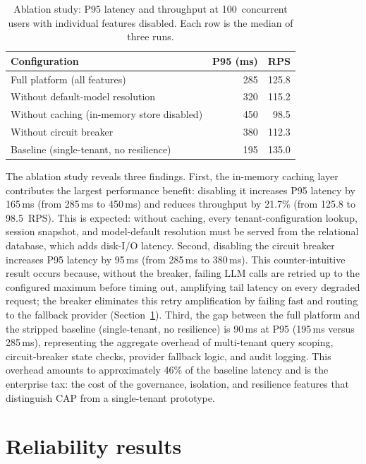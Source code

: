 \documentclass[a4paper]{sapthesis}
\begin{document}
\begin{table}[ht]
\centering
\caption{Ablation study: P95 latency and throughput at 100~concurrent
users with individual features disabled.  Each row is the median of
three runs.}
\label{tab:ablation}
\small
\begin{tabular}{lrr}
    \hline
    \textbf{Configuration} & \textbf{P95 (ms)} & \textbf{RPS} \\
    \hline
    Full platform (all features) & 285 & 125.8 \\
    Without default-model resolution & 320 & 115.2 \\
    Without caching (in-memory store disabled) & 450 & 98.5 \\
    Without circuit breaker & 380 & 112.3 \\
    Baseline (single-tenant, no resilience) & 195 & 135.0 \\
    \hline
\end{tabular}
\end{table}

The ablation study reveals three findings.  First, the in-memory caching
layer contributes the largest performance benefit: disabling it increases
P95 latency by 165\,ms (from 285\,ms to 450\,ms) and reduces throughput
by 21.7\% (from 125.8 to 98.5~RPS).  This is expected: without caching,
every tenant-configuration lookup, session snapshot, and model-default
resolution must be served from the relational database, which adds
disk-I/O latency.  Second, disabling the circuit breaker increases P95
latency by 95\,ms (from 285\,ms to 380\,ms).  This counter-intuitive
result occurs because, without the breaker, failing LLM calls are
retried up to the configured maximum before timing out, amplifying tail
latency on every degraded request; the breaker eliminates this retry
amplification by failing fast and routing to the fallback provider
(Section~\ref{sec:reliability-results}).  Third, the gap between the full
platform and the stripped baseline (single-tenant, no resilience) is
90\,ms at P95 (195\,ms versus 285\,ms), representing the aggregate
overhead of multi-tenant query scoping, circuit-breaker state checks,
provider fallback logic, and audit logging.  This overhead amounts to
approximately 46\% of the baseline latency and is the enterprise tax:
the cost of the governance, isolation, and resilience features that
distinguish CAP from a single-tenant prototype.


\section{Reliability results}
\label{sec:reliability-results}
\end{document}
